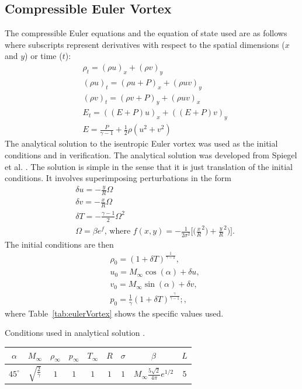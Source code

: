 \documentclass[mca,article,submit,moreauthors,pdftex]{Definitions/mdpi}
\begin{document}
\begin{paracol}{2}
\section{Compressible Euler Vortex}
\label{Compressible-Euler}
The compressible Euler equations and the equation of state used are as follows where subscripts represent derivatives with respect to the spatial dimensions ($x$ and $y$) or time ($t$):
\begin{align*}
    &\rho_t  = (\rho u)_x + (\rho v)_y \\ 
    &(\rho u)_t  = (\rho u+P)_x + (\rho u v)_y\\
    &(\rho v)_t  = (\rho v+P)_y + (\rho u v)_x\\
    &E_t = ((E+P)u)_x+((E+P)v)_y\\
    &E = \frac{P}{\gamma -1}+\frac{1}{2}\rho(u^2+v^2)
\end{align*}
The analytical solution to the isentropic Euler vortex was used as the initial conditions and in verification. The analytical solution was developed from Spiegel et al. \cite{SpiegelAMethods}. The solution is simple in the sense that it is just translation of the initial conditions. It involves superimposing perturbations in the form
\begin{align*}
    &\delta u = -\frac{y}{R}\Omega\\
    &\delta v = -\frac{x}{R}\Omega\\
    &\delta T = -\frac{\gamma-1}{2} \Omega^2\\
    &\Omega = \beta e^{f}\text{, where } f(x,y) = -\frac{1}{2\sigma^2}\Bigg[\bigg(\frac{x}{R}^2\bigg)+\frac{y}{R}^2\bigg)\Bigg].
\end{align*}
The initial conditions are then 
\begin{align*}
    &\rho_0 = (1+\delta T)^{\frac{1}{\gamma-1}},\\
    &u_0 = M_\infty \cos(\alpha)+\delta u,\\
    &v_0 = M_\infty \sin(\alpha)+\delta v,\\
    &p_0 = \frac{1}{\gamma}(1+\delta T)^\frac{\gamma}{\gamma-1} ;,
\end{align*}
where Table~\ref{tab:eulerVortex} shows the specific values used.

\begin{specialtable}[H]
    \caption{Conditions used in analytical solution \cite{shu1998essentially}.}
    \label{tab:eulerVortex}
    \begin{tabular}{@{}ccccccccc@{}}
    \toprule
    $\alpha$ & $M_\infty$  & $\rho_\infty$ & $p_\infty$ & $T_\infty$ & $R$ & $\sigma$ & $\beta$ & $L$ \\ 
    \midrule
    $45^\circ$ &  $\sqrt{\frac{2}{\gamma}}$ & $1$ & $1$ & $1$ & $1$ & $1$ & $M_\infty \frac{5\sqrt{2}}{4\pi}e^{1/2}$ & $5$\\
    \bottomrule
    \end{tabular}
\end{specialtable}


\end{paracol}
\end{document}
